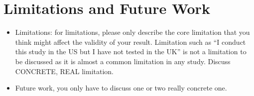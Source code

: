 \section{Limitations and Future Work}
\begin{itemize}
    \item Limitations: for limitations, please only describe the core limitation that you think might affect the validity of your result. Limitation such as “I conduct this study in the US but I have not tested in the UK” is not a limitation to be discussed as it is almost a common limitation in any study.  Discuss CONCRETE, REAL limitation.
    \item Future work, you only have to discuss one or two really concrete one.
\end{itemize}

